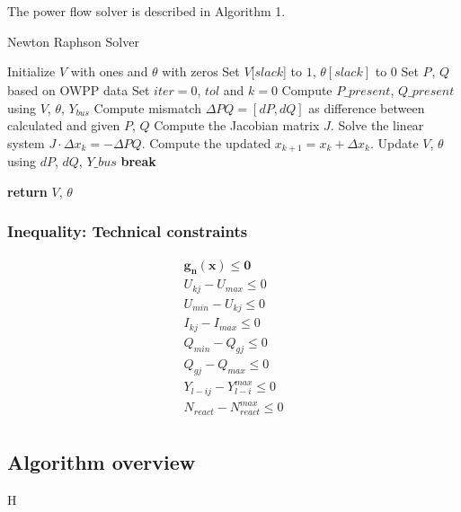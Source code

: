 \documentclass[a4paper,11pt, titlepage, twoside]{article}
\begin{document}
The power flow solver is described in Algorithm 1.
\begin{algorithm}[h]
    \caption{Newton Raphson Solver}
    \begin{algorithmic}[1]
        \State Initialize $V$ with ones and $\theta$ with zeros
        \Statex \hspace{\algorithmicindent}Set $V[slack$] to $1$, $\theta[slack]$ to $0$
        \Statex \hspace{\algorithmicindent}Set $P_{}$, $Q_{}$ based on OWPP data
        \Statex \hspace{\algorithmicindent}Set $iter = 0 $, $tol$ and $k = 0$
            \State Compute $P\_present$, $Q\_present$ using $V$, $\theta$, $Y_{bus}$
            \State Compute mismatch $\Delta PQ = [dP, dQ]$ as difference between calculated and given $P$, $Q$
            \State Compute the Jacobian matrix $J$.
            \State Solve the linear system $J \cdot \Delta x_k = -\Delta PQ$.
            \State Compute the updated $x_{k+1} = x_{k} + \Delta x_k $.
            \State Update $V$, $\theta$ using $dP$, $dQ$, $Y\_bus$
                \State \textbf{break}
            \EndIf
            
        \EndWhile
        \State \textbf{return} $V$, $\theta$
    \EndProcedure
    \end{algorithmic}
    \end{algorithm}

\subsubsection{Inequality: Technical constraints}

\begin{gather}
    \mathbf{g_n(x)\leq0} \\
    U_{kj}-U_{max}\leq0 \\
    U_{min}-U_{kj}\leq0 \\
    I_{kj}-I_{max}\leq0 \\
    Q_{min}-Q_{gj}\leq0 \\
    Q_{gj}-Q_{max}\leq0 \\
    Y_{l-ij}-Y_{l-i}^{max}\leq0 \\
    N_{react}-N_{react}^{max}\leq0 \\
\end{gather}

\newpage
\subsection{Algorithm overview}
H
\end{document}
